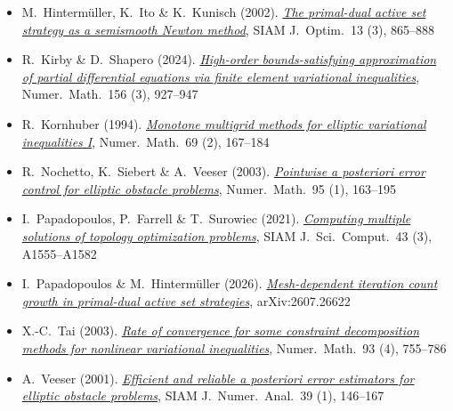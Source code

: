 \begin{itemize}


\item M.~Hinterm\"uller, K.~Ito \& K.~Kunisch (2002). \href{https://doi.org/10.1137/S1052623401383558}{\emph{The primal-dual active set strategy as a semismooth Newton method}}, SIAM J.~Optim.~13 (3), 865--888


\item R.~Kirby \& D.~Shapero (2024). \href{https://doi.org/10.1007/s00211-024-01405-y}{\emph{High-order bounds-satisfying approximation of partial differential equations via finite element variational inequalities}}, Numer.~Math.~156 (3), 927--947

\item R.~Kornhuber (1994). \href{https://doi.org/10.1007/BF03325426}{\emph{Monotone multigrid methods for elliptic variational inequalities I}}, Numer.~Math.~69 (2), 167--184

\item R.~Nochetto, K.~Siebert \& A.~Veeser (2003). \href{https://doi.org/10.1007/s00211-002-0411-3}{\emph{Pointwise a posteriori error control for elliptic obstacle problems}}, Numer.~Math.~95 (1), 163--195

\item I.~Papadopoulos, P.~Farrell \& T.~Surowiec (2021). \href{https://doi.org/10.1137/20M1326209}{\emph{Computing multiple solutions of topology optimization problems}}, SIAM J.~Sci.~Comput.~43 (3), A1555--A1582

\item I.~Papadopoulos \& M.~Hinterm\"uller (2026). \href{https://arxiv.org/abs/2607.26622}{\emph{Mesh-dependent iteration count growth in primal-dual active set strategies}}, arXiv:2607.26622

\item X.-C.~Tai (2003). \href{https://doi.org/10.1007/s002110200404}{\emph{Rate of convergence for some constraint decomposition methods for nonlinear variational inequalities}}, Numer.~Math.~93 (4), 755--786

\item A.~Veeser (2001). \href{https://doi.org/10.1137/S0036142900370812}{\emph{Efficient and reliable a posteriori error estimators for elliptic obstacle problems}}, SIAM J.~Numer.~Anal.~39 (1), 146--167
\end{itemize}
